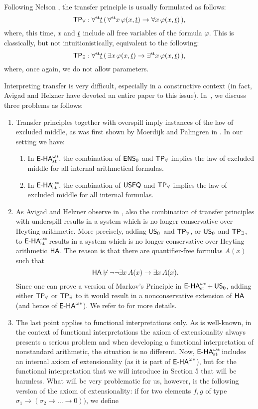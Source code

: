 Following Nelson \cite{nelson77}, the transfer principle is usually formulated as follows:
\[ \textsf{\upshape TP}_{\forall}: \forall^{\operatorname{st}{}}\! \underline t \, ( \, \forall^{\operatorname{st}{}}\! x \,  \varphi(x, \underline t) \to \forall x \, \varphi(x, \underline t) \, ), \]
where, this time, $x$ and $\underline t$ include all free variables of the formula $\varphi$. This is classically, but not intuitionistically, equivalent to the following:
\[ \textsf{\upshape TP}_{\exists}: \forall^{\operatorname{st}{}}\! \underline t \, ( \, \exists x \,  \varphi(x, \underline t) \to \exists^{\operatorname{st}{}}\! x \, \varphi(x, \underline t) \, ), \]
where, once again, we do not allow parameters.

Interpreting transfer is very difficult, especially in a constructive context (in fact, Avigad and Helzner have devoted an entire paper \cite{avigadhelzner02} to this issue).
In~\cite{BBS12}, we discuss three problems as follows:
\begin{enumerate}
\item Transfer principles together with overspill imply instances of the law of excluded middle, as was first shown by Moerdijk and Palmgren in \cite{moerdijkpalmgren97}. In our setting we have:
\begin{prop}
\begin{enumerate}
\item In ${\textsf{\upshape E-HA}}^{\omega*}_{\operatorname{st}{}}\!$, the combination of $\textsf{\upshape ENS}_0$ and $\textsf{\upshape TP}_{\forall}$ implies the law of excluded middle for all internal arithmetical formulas.
\item In ${\textsf{\upshape E-HA}}^{\omega*}_{\operatorname{st}{}}\!$, the combination of $\textsf{\upshape USEQ}$ and $\textsf{\upshape TP}_{\forall}$ implies the law of excluded middle for all internal formulas.
\end{enumerate}
\end{prop}
\item As Avigad and Helzner observe in \cite{avigadhelzner02}, also the combination of transfer principles with underspill results in a system which is no longer conservative over Heyting arithmetic. More precisely, adding $\textsf{\upshape US}_0$ and $\textsf{\upshape TP}_{\forall}$, or $\textsf{\upshape US}_0$ and $\textsf{\upshape TP}_{\exists}$, to ${\textsf{\upshape E-HA}}^{\omega*}_{\operatorname{st}{}}\!$ results in a system which is no longer conservative over Heyting arithmetic ${\textsf{\upshape HA}}$. The reason is that there are quantifier-free formulas $A(x)$ such that
\[ {\textsf{\upshape HA}} \not\vdash \lnot \lnot \exists x \, A(x) \to \exists x \, A(x). \]
Since one can prove a version of Markov's Principle in ${\textsf{\upshape E-HA}}^{\omega*}_{\operatorname{st}{}}\! + \textsf{\upshape US}_0$, adding either $\textsf{\upshape TP}_{\forall}$ or $\textsf{\upshape TP}_{\exists}$ to it would result in a nonconservative extension of ${\textsf{\upshape HA}}$ (and hence of ${\textsf{\upshape E-HA}}^{\omega*}$). We refer to \cite{avigadhelzner02} for more details.
\item The last point applies to functional interpretations only. As is well-known, in the context of functional interpretations the axiom of extensionality always presents a serious problem and when developing a functional interpretation of nonstandard arithmetic, the situation is no different. Now, ${\textsf{\upshape E-HA}}^{\omega*}_{\operatorname{st}{}}\!$ includes an internal axiom of extensionality (as it is part of ${\textsf{\upshape E-HA}}^{\omega*}$), but for the functional interpretation that we will introduce in Section 5 that will be harmless. What will be very problematic for us, however, is the following version of the axiom of extensionality: if for two elements $f, g$ of type $\sigma_1 \to (\sigma_2 \to \ldots \to 0))$, we define

\end{enumerate}
